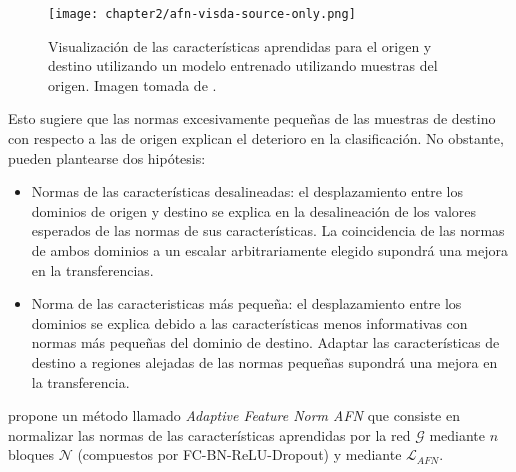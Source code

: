 \begin{figure}[H]
    \centering
    \texttt{[image: chapter2/afn-visda-source-only.png]}

    \caption{Visualización de las características aprendidas para el origen y destino utilizando un modelo entrenado utilizando muestras del origen. Imagen tomada de \cite{xu2019larger}.}
    \label{fig:afn-source-only}
\end{figure}

Esto sugiere que las normas excesivamente pequeñas de las muestras de destino con respecto a las de origen explican el
deterioro en la clasificación. No obstante, pueden plantearse dos hipótesis:

\begin{itemize}
    \item Normas de las características desalineadas: el desplazamiento entre los dominios de origen y destino se explica en la
          desalineación de los valores esperados de las normas de sus características. La coincidencia de las normas de ambos
          dominios a un escalar arbitrariamente elegido supondrá una mejora en la transferencias.
    \item Norma de las caracteristicas más pequeña: el desplazamiento entre los dominios se explica debido a las características
          menos informativas con normas más pequeñas del dominio de destino. Adaptar las características de destino a regiones
          alejadas de las normas pequeñas supondrá una mejora en la transferencia.
\end{itemize}

\cite{xu2019larger} propone un método llamado {\it Adaptive Feature Norm AFN} que consiste en normalizar las normas de las características aprendidas por la red $\mathcal{G}$  mediante $n$ bloques $\mathcal{N}$ (compuestos por FC-BN-ReLU-Dropout) y mediante $\mathcal{L}_{AFN}$.

